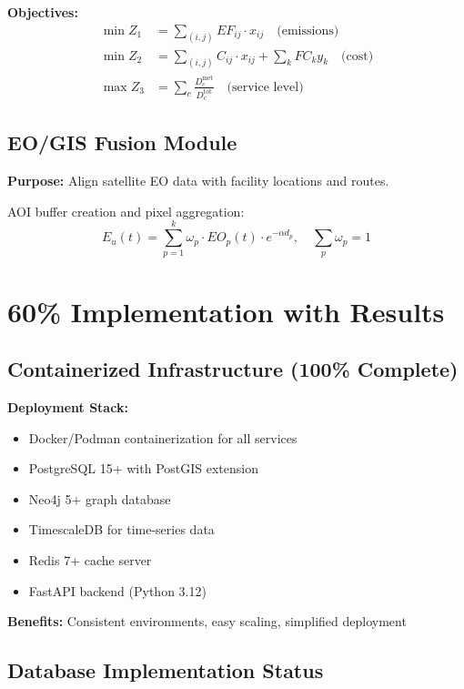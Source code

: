 \documentclass[11pt,a4paper]{article}
\begin{document}
\textbf{Objectives:}
\begin{align}
\min Z_1 &= \sum_{(i,j)} EF_{ij} \cdot x_{ij} \quad \text{(emissions)} \\
\min Z_2 &= \sum_{(i,j)} C_{ij} \cdot x_{ij} + \sum_k FC_k y_k \quad \text{(cost)} \\
\max Z_3 &= \sum_c \frac{D^{\text{met}}_c}{D^{\text{tot}}_c} \quad \text{(service level)}
\end{align}

\subsection{EO/GIS Fusion Module}

\textbf{Purpose:} Align satellite EO data with facility locations and routes.

AOI buffer creation and pixel aggregation:
\begin{equation}
E_u(t) = \sum_{p=1}^{k} \omega_p \cdot EO_p(t) \cdot e^{-\alpha d_p}, \quad \sum_p \omega_p = 1
\end{equation}

\section{60\% Implementation with Results}

\subsection{Containerized Infrastructure (100\% Complete)}

\textbf{Deployment Stack:}
\begin{itemize}
    \item Docker/Podman containerization for all services
    \item PostgreSQL 15+ with PostGIS extension
    \item Neo4j 5+ graph database
    \item TimescaleDB for time-series data
    \item Redis 7+ cache server
    \item FastAPI backend (Python 3.12)
\end{itemize}

\textbf{Benefits:} Consistent environments, easy scaling, simplified deployment

\subsection{Database Implementation Status}
\end{document}
